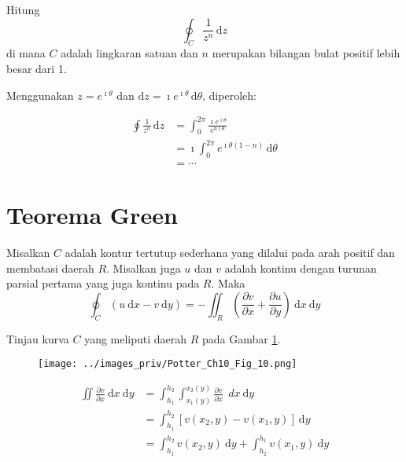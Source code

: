 \begin{contoh}
Hitung
\begin{equation*}
\oint_{C} \frac{1}{z^n} \, \mathrm{d}z    
\end{equation*}
di mana $C$ adalah lingkaran satuan dan $n$ merupakan bilangan bulat positif
lebih besar dari 1.
\end{contoh}

Menggunakan $z = e^{\imath \theta}$ dan
$\mathrm{d}z = \imath e^{\imath \theta}\, \mathrm{d}\theta$, diperoleh:

\begin{align*}
\oint \frac{1}{z^n} \, \mathrm{d}z & = \int_{0}^{2\pi} \frac{\imath e^{\imath \theta}}{e^{n \imath \theta}} \\
& = \imath \int_{0}^{2\pi} e^{\imath \theta (1 - n)} \, \mathrm{d} \theta \\
& = \cdots
\end{align*}


\section{Teorema Green}

\begin{theorem}
Misalkan $C$ adalah kontur tertutup sederhana yang dilalui pada arah
positif dan membatasi daerah $R$. Misalkan juga $u$ dan $v$ adalah
kontinu dengan turunan parsial pertama yang juga kontinu pada $R$.
Maka
\begin{equation*}
\oint_{C}\left(u\ \mathrm{d}x-v\ \mathrm{d}y\right) =
-\iint_{R}\left(\frac{\partial v}{\partial x} +
\frac{\partial u}{\partial y}\right)\ \mathrm{d}x\mathrm{\ d}y
\end{equation*}
\end{theorem}


Tinjau kurva $C$ yang meliputi daerah $R$ pada
Gambar \ref{fig:Potter_Ch10_Fig_10}.
\begin{figure}[h]
{\centering
\texttt{[image: ../images\_priv/Potter\_Ch10\_Fig\_10.png]}
\par}\label{fig:Potter_Ch10_Fig_10}
\end{figure}

\begin{align*}
\iint\frac{\partial v}{\partial x}\ \mathrm{d}x\mathrm{\ d}y & =\int_{h_{1}}^{h_{2}}\int_{x_{1}(y)}^{x_{2}(y)}\frac{\partial v}{\partial x}\ \ dx\mathrm{\ d}y\\
 & =\int_{h_{1}}^{h_{2}}\left[v(x_{2},y)-v(x_{1},y)\right]\ \mathrm{d}y\\
 & =\int_{h_{1}}^{h_{2}}v(x_{2},y)\ \mathrm{d}y+\int_{h_{2}}^{h_{1}}v(x_{1},y)\ \mathrm{d}y
\end{align*}

